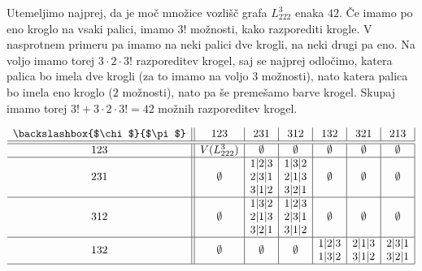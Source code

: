 \documentclass[12pt,a4paper]{amsart}
\theoremstyle{definition} %
\theoremstyle{plain} %
\begin{document}
    Utemeljimo najprej, da je moč množice vozlišč grafa $L_{222}^3$ enaka $42$. Če imamo po eno kroglo na vsaki palici, imamo $3!$ možnosti, kako razporediti krogle.
    V nasprotnem primeru pa imamo na neki palici dve krogli, na neki drugi pa eno. Na voljo imamo torej $3 \cdot 2 \cdot 3!$ razporeditev krogel, saj se najprej odločimo, katera palica bo imela dve krogli (za to imamo na voljo $3$ možnosti), nato katera palica bo imela eno kroglo ($2$ možnosti), nato pa še premešamo barve krogel. Skupaj imamo torej $3! + 3 \cdot 2 \cdot 3! = 42$ možnih razporeditev krogel.

    \begin{table}[h]
        \[
        \begin{array}{c||c|c|c|c|c|c|}
        \text{\backslashbox{$\chi$}{$\pi$}} & 123 & 231 & 312 & 132 & 321 & 213 \\ \hline \hline 
        123 & V(L^3_{222}) & \emptyset & \emptyset & \emptyset & \emptyset & \emptyset \\ \hline
        231 & \emptyset & \begin{tabular}{@{}c@{}}1|2|3 \\ 2|3|1 \\ 3|1|2 \end{tabular} & \begin{tabular}{@{}c@{}}1|3|2 \\ 2|1|3 \\ 3|2|1 \end{tabular} & \emptyset & \emptyset & \emptyset \\ \hline
        312 & \emptyset & \begin{tabular}{@{}c@{}}1|3|2 \\ 2|1|3 \\ 3|2|1 \end{tabular} & \begin{tabular}{@{}c@{}}1|2|3 \\ 2|3|1 \\ 3|1|2 \end{tabular} & \emptyset & \emptyset & \emptyset \\ \hline
        132 & \emptyset & \emptyset & \emptyset & \begin{tabular}{@{}c@{}}1|2|3 \\ 1|3|2 \end{tabular} & \begin{tabular}{@{}c@{}}2|1|3 \\ 3|1|2 \end{tabular} & \begin{tabular}{@{}c@{}}2|3|1 \\ 3|2|1 \end{tabular} \\ \hline

\end{array}\]
\end{table}
\end{document}
